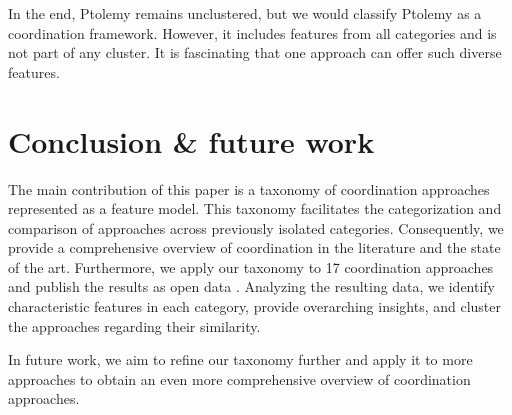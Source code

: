 \documentclass[runningheads]{llncs}
\begin{document}
In the end, Ptolemy remains unclustered, but we would classify Ptolemy as a coordination framework.
However, it includes features from all categories and is not part of any cluster.
It is fascinating that one approach can offer such diverse features.


\section{Conclusion \& future work} \label{sec: conclusion}

The main contribution of this paper is a taxonomy of coordination approaches represented as a feature model.
This taxonomy facilitates the categorization and comparison of approaches across previously isolated categories.
Consequently, we provide a comprehensive overview of coordination in the literature and the state of the art.
Furthermore, we apply our taxonomy to 17 coordination approaches and publish the results as open data \cite{timkrauterArtifactsCoordination2024}.
Analyzing the resulting data, we identify characteristic features in each category, provide overarching insights, and cluster the approaches regarding their similarity. 

In future work, we aim to refine our taxonomy further and apply it to more approaches to obtain an even more comprehensive overview of coordination approaches.



\end{document}
